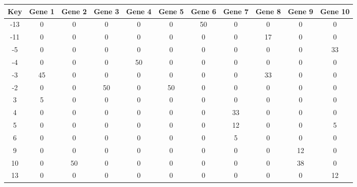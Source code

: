 \begin{tabular}{|c|c|c|c|c|c|c|c|c|c|c|}
\hline
Key & Gene 1 & Gene 2 & Gene 3 & Gene 4 & Gene 5 & Gene 6 & Gene 7 & Gene 8 & Gene 9 & Gene 10 \\
\hline
-13 & 0 & 0 & 0 & 0 & 0 & 50 & 0 & 0 & 0 & 0 \\
-11 & 0 & 0 & 0 & 0 & 0 & 0 & 0 & 17 & 0 & 0 \\
-5 & 0 & 0 & 0 & 0 & 0 & 0 & 0 & 0 & 0 & 33 \\
-4 & 0 & 0 & 0 & 50 & 0 & 0 & 0 & 0 & 0 & 0 \\
-3 & 45 & 0 & 0 & 0 & 0 & 0 & 0 & 33 & 0 & 0 \\
-2 & 0 & 0 & 50 & 0 & 50 & 0 & 0 & 0 & 0 & 0 \\
3 & 5 & 0 & 0 & 0 & 0 & 0 & 0 & 0 & 0 & 0 \\
4 & 0 & 0 & 0 & 0 & 0 & 0 & 33 & 0 & 0 & 0 \\
5 & 0 & 0 & 0 & 0 & 0 & 0 & 12 & 0 & 0 & 5 \\
6 & 0 & 0 & 0 & 0 & 0 & 0 & 5 & 0 & 0 & 0 \\
9 & 0 & 0 & 0 & 0 & 0 & 0 & 0 & 0 & 12 & 0 \\
10 & 0 & 50 & 0 & 0 & 0 & 0 & 0 & 0 & 38 & 0 \\
13 & 0 & 0 & 0 & 0 & 0 & 0 & 0 & 0 & 0 & 12 \\
\hline
\end{tabular}